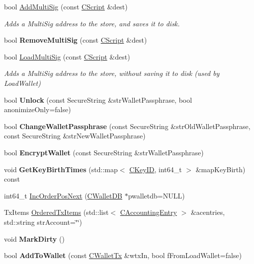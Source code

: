 \begin{DoxyCompactItemize}
bool \mbox{\hyperlink{group__map_wallet_gab19582b017922e4c502491cc55a67621}{Add\+Multi\+Sig}} (const \mbox{\hyperlink{class_c_script}{C\+Script}} \&dest)
\begin{DoxyCompactList}\small\item\em Adds a Multi\+Sig address to the store, and saves it to disk. \end{DoxyCompactList}\item 
bool {\bfseries Remove\+Multi\+Sig} (const \mbox{\hyperlink{class_c_script}{C\+Script}} \&dest)
\item 
bool \mbox{\hyperlink{group__map_wallet_gab07b5d46c02a9997a653a9063af9d4ca}{Load\+Multi\+Sig}} (const \mbox{\hyperlink{class_c_script}{C\+Script}} \&dest)
\begin{DoxyCompactList}\small\item\em Adds a Multi\+Sig address to the store, without saving it to disk (used by Load\+Wallet) \end{DoxyCompactList}\item 
bool {\bfseries Unlock} (const Secure\+String \&str\+Wallet\+Passphrase, bool anonimize\+Only=false)
\item 
bool {\bfseries Change\+Wallet\+Passphrase} (const Secure\+String \&str\+Old\+Wallet\+Passphrase, const Secure\+String \&str\+New\+Wallet\+Passphrase)
\item 
bool {\bfseries Encrypt\+Wallet} (const Secure\+String \&str\+Wallet\+Passphrase)
\item 
\mbox{\label{class_c_wallet_acb2fdaf647fa2d812d58e998848e681d}} 
void {\bfseries Get\+Key\+Birth\+Times} (std\+::map$<$ \mbox{\hyperlink{class_c_key_i_d}{C\+Key\+ID}}, int64\+\_\+t $>$ \&map\+Key\+Birth) const
\item 
int64\+\_\+t \mbox{\hyperlink{group__map_wallet_ga7a76d68661e6879651ac0b11f2893e58}{Inc\+Order\+Pos\+Next}} (\mbox{\hyperlink{class_c_wallet_d_b}{C\+Wallet\+DB}} $\ast$pwalletdb=N\+U\+LL)
\item 
Tx\+Items \mbox{\hyperlink{group__map_wallet_ga740572131004d77fbdb4617ec1aafb4a}{Ordered\+Tx\+Items}} (std\+::list$<$ \mbox{\hyperlink{class_c_accounting_entry}{C\+Accounting\+Entry}} $>$ \&acentries, std\+::string str\+Account=\char`\"{}\char`\"{})
\item 
void {\bfseries Mark\+Dirty} ()
\item 
bool {\bfseries Add\+To\+Wallet} (const \mbox{\hyperlink{class_c_wallet_tx}{C\+Wallet\+Tx}} \&wtx\+In, bool f\+From\+Load\+Wallet=false)
\item 

\end{DoxyCompactItemize}
